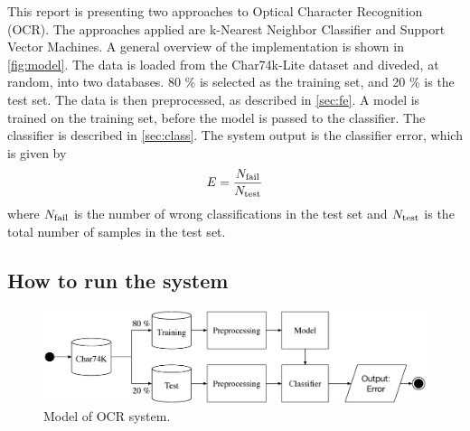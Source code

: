 \documentclass[../main.tex]{subfiles}
\begin{document}
This report is presenting two approaches to Optical Character Recognition (OCR). The approaches applied are k-Nearest Neighbor Classifier and Support Vector Machines. A general overview of the implementation is shown in \autoref{fig:model}. The data is loaded from the Char74k-Lite dataset and diveded, at random, into two databases. 80 \% is selected as the training set, and 20 \% is the test set. The data is then preprocessed, as described in \autoref{sec:fe}. A model is trained on the training set, before the model is passed to the classifier. The classifier is described in \autoref{sec:class}. The system output is the classifier error, which is given by
\begin{equation}
	E = \frac{N_{\rm fail}}{N_{\rm test}}
\end{equation}
where $N_{\rm fail}$ is the number of wrong classifications in the test set and $N_{\rm test}$ is the total number of samples in the test set.

\subsection{How to run the system}

\begin{figure}
  \centering
  \includegraphics[width=\textwidth]{figures/model.eps}
  \caption{Model of OCR system.} 
  \label{fig:model}
\end{figure}
\end{document}
